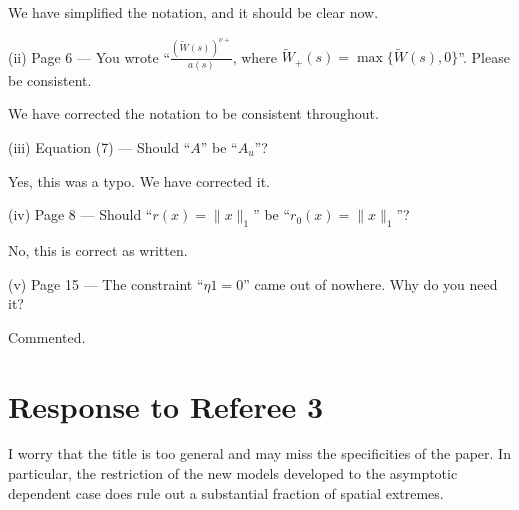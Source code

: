 \documentclass[12pt
]{article}
\begin{document}
\begin{Res}
We have simplified the notation, and it should be clear now.
\end{Res}

\begin{Comments}
(ii) Page 6 --- You wrote ``$\frac{(\tilde{W}(s))^{\nu+}}{a(s)}$, where $\tilde{W}_+(s)=\max\{\tilde{W}(s),0\}$''. Please be consistent.
\end{Comments}

\begin{Res}
We have corrected the notation to be consistent throughout.
\end{Res}

\begin{Comments}
(iii) Equation (7) --- Should ``$A$'' be ``$A_u$''?
\end{Comments}

\begin{Res}
Yes, this was a typo. We have corrected it.
\end{Res}

\begin{Comments}
(iv) Page 8 --- Should ``$r(x)=\|x\|_1$'' be ``$r_0(x)=\|x\|_1$''?
\end{Comments}

\begin{Res}
No, this is correct as written. 
\end{Res}

\begin{Comments}
(v) Page 15 --- The constraint ``$\eta 1 = 0$'' came out of nowhere. Why do you need it?
\end{Comments}

\begin{Res}
Commented.
\end{Res}

\dashline


\section*{Response to Referee 3}

\medskip

\begin{Comments}
I worry that the title is too general and may miss the specificities of the paper. In particular, the restriction of the new models developed to the asymptotic dependent case does rule out a substantial fraction of spatial extremes.
\end{Comments}
\end{document}
